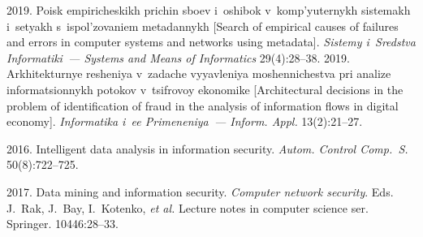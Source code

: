   \begin{multicols}{2}

\renewcommand{\bibname}{\protect\rmfamily References}

{\small\frenchspacing
 {%
 \begin{thebibliography}{99} 
 2019. Poisk 
empiricheskikh prichin sboev i~oshibok v~komp'yuternykh sistemakh i~setyakh s~ispol'zovaniem 
metadannykh [Search of empirical causes of failures and errors in computer systems and networks 
using metadata]. \textit{Sistemy i~Sredstva Informatiki~--- Systems and Means of Informatics}  
29(4):28--38. 
 2019. Arkhitekturnye 
resheniya v~zadache vyyavleniya moshennichestva pri analize informatsionnykh potokov v~tsifrovoy 
ekonomike [Architectural decisions in the problem of identification of fraud in the analysis of 
information flows in digital economy]. \textit{Informatika i~ee Primeneniya~--- Inform. Appl.} 
13(2):21--27. 

 2016. Intelligent data 
analysis in information security. \textit{Autom. Control Comp.~S.} 50(8):722--725.

 2017. Data mining and information security. 
\textit{Computer network security}. Eds. 
J.~Rak, J.~Bay, I.~Kotenko, \textit{et al.} Lecture notes in computer science ser. Springer.  
10446:28--33.


\end{thebibliography}}}
\end{multicols}
